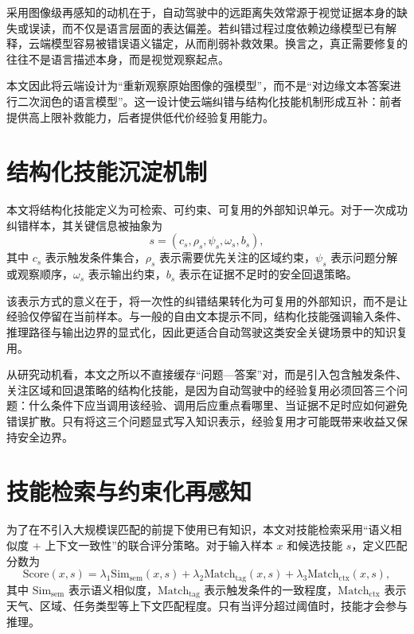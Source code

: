 采用图像级再感知的动机在于，自动驾驶中的远距离失效常源于视觉证据本身的缺失或误读，而不仅是语言层面的表达偏差。若纠错过程过度依赖边缘模型已有解释，云端模型容易被错误语义锚定，从而削弱补救效果。换言之，真正需要修复的往往不是语言描述本身，而是视觉观察起点。

本文因此将云端设计为“重新观察原始图像的强模型”，而不是“对边缘文本答案进行二次润色的语言模型”。这一设计使云端纠错与结构化技能机制形成互补：前者提供高上限补救能力，后者提供低代价经验复用能力。

\section{结构化技能沉淀机制}
\label{sec:method-skill}

本文将结构化技能定义为可检索、可约束、可复用的外部知识单元。对于一次成功纠错样本，其关键信息被抽象为
\begin{equation}
  s=(c_s,\rho_s,\psi_s,\omega_s,b_s),
\end{equation}
其中 $c_s$ 表示触发条件集合，$\rho_s$ 表示需要优先关注的区域约束，$\psi_s$ 表示问题分解或观察顺序，$\omega_s$ 表示输出约束，$b_s$ 表示在证据不足时的安全回退策略。

该表示方式的意义在于，将一次性的纠错结果转化为可复用的外部知识，而不是让经验仅停留在当前样本。与一般的自由文本提示不同，结构化技能强调输入条件、推理路径与输出边界的显式化，因此更适合自动驾驶这类安全关键场景中的知识复用。

从研究动机看，本文之所以不直接缓存“问题—答案”对，而是引入包含触发条件、关注区域和回退策略的结构化技能，是因为自动驾驶中的经验复用必须回答三个问题：什么条件下应当调用该经验、调用后应重点看哪里、当证据不足时应如何避免错误扩散。只有将这三个问题显式写入知识表示，经验复用才可能既带来收益又保持安全边界。

\section{技能检索与约束化再感知}
\label{sec:method-match}

为了在不引入大规模误匹配的前提下使用已有知识，本文对技能检索采用“语义相似度 + 上下文一致性”的联合评分策略。对于输入样本 $x$ 和候选技能 $s$，定义匹配分数为
\begin{equation}
  \mathrm{Score}(x,s)=
  \lambda_1 \mathrm{Sim}_{\mathrm{sem}}(x,s)+
  \lambda_2 \mathrm{Match}_{\mathrm{tag}}(x,s)+
  \lambda_3 \mathrm{Match}_{\mathrm{ctx}}(x,s),
\end{equation}
其中 $\mathrm{Sim}_{\mathrm{sem}}$ 表示语义相似度，$\mathrm{Match}_{\mathrm{tag}}$ 表示触发条件的一致程度，$\mathrm{Match}_{\mathrm{ctx}}$ 表示天气、区域、任务类型等上下文匹配程度。只有当评分超过阈值时，技能才会参与推理。

